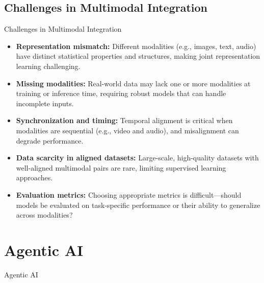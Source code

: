 \subsection{Challenges in Multimodal Integration}
\begin{frame}[allowframebreaks]{Challenges in Multimodal Integration}
    \begin{itemize}
        \vspace{-0.5em}
        \item \textbf{Representation mismatch:} Different modalities (e.g., images, text, audio) have distinct statistical properties and structures, making joint representation learning challenging.
        \item \textbf{Missing modalities:} Real-world data may lack one or more modalities at training or inference time, requiring robust models that can handle incomplete inputs.
        \item \textbf{Synchronization and timing:} Temporal alignment is critical when modalities are sequential (e.g., video and audio), and misalignment can degrade performance.
        \item \textbf{Data scarcity in aligned datasets:} Large-scale, high-quality datasets with well-aligned multimodal pairs are rare, limiting supervised learning approaches.
        \item \textbf{Evaluation metrics:} Choosing appropriate metrics is difficult—should models be evaluated on task-specific performance or their ability to generalize across modalities?
    \end{itemize}
\end{frame}


\section{Agentic AI}
\begin{frame}{}
    \LARGE Agentic AI
\end{frame}

